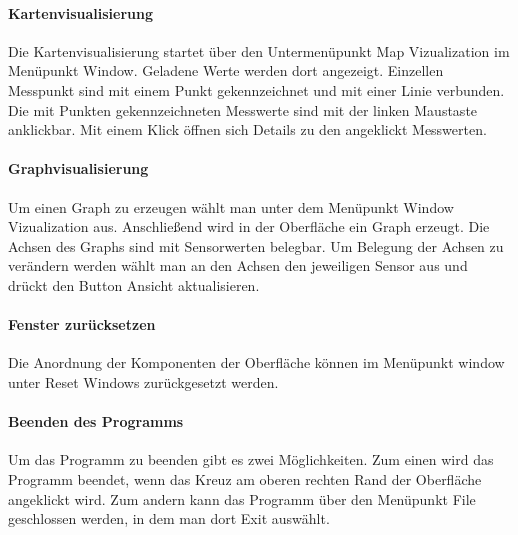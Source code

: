 \paragraph{Kartenvisualisierung}
Die Kartenvisualisierung startet über den Untermenüpunkt Map Vizualization im Menüpunkt Window. Geladene Werte werden dort angezeigt. Einzellen Messpunkt sind mit einem Punkt gekennzeichnet und mit einer Linie verbunden. Die mit Punkten gekennzeichneten Messwerte sind mit der linken Maustaste anklickbar. Mit einem Klick öffnen sich Details zu den angeklickt Messwerten.

\paragraph{Graphvisualisierung}
Um einen Graph zu erzeugen wählt man unter dem Menüpunkt Window Vizualization aus. Anschließend wird in der Oberfläche ein Graph erzeugt. Die Achsen des Graphs sind mit Sensorwerten belegbar. Um Belegung der Achsen zu verändern werden wählt man an den Achsen den jeweiligen Sensor aus und drückt den Button Ansicht aktualisieren.


\paragraph{Fenster zurücksetzen}
Die Anordnung der Komponenten der Oberfläche können im Menüpunkt window unter Reset Windows zurückgesetzt werden.

\paragraph{Beenden des Programms}
Um das Programm zu beenden gibt es zwei Möglichkeiten. Zum einen wird das Programm beendet, wenn das Kreuz am oberen rechten Rand der Oberfläche angeklickt wird. Zum andern kann das Programm über den Menüpunkt File geschlossen werden, in dem man dort Exit auswählt.
